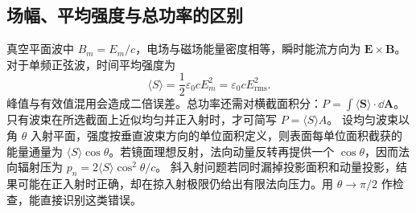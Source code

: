 \subsection{场幅、平均强度与总功率的区别}
真空平面波中 $B_m=E_m/c$，电场与磁场能量密度相等，瞬时能流方向为 $\boldsymbol E\times\boldsymbol B$。对于单频正弦波，时间平均强度为
\[
 \langle S\rangle=\frac12\varepsilon_0cE_m^2
 =\varepsilon_0cE_{\mathrm{rms}}^2.
\]
峰值与有效值混用会造成二倍误差。总功率还需对横截面积分：$P=\int\langle\boldsymbol S\rangle\cdot\dd\boldsymbol A$。只有波束在所选截面上近似均匀并正入射时，才可简写 $P=\langle S\rangle A$。
设均匀波束以角 $\theta$ 入射平面，强度按垂直波束方向的单位面积定义，则表面每单位面积截获的能量通量为 $\langle S\rangle\cos\theta$。若镜面理想反射，法向动量反转再提供一个 $\cos\theta$，因而法向辐射压为
$p_n=2\langle S\rangle\cos^2\theta/c$。
斜入射问题若同时漏掉投影面积和动量投影，结果可能在正入射时正确，却在掠入射极限仍给出有限法向压力。用 $\theta\to\pi/2$ 作检查，能直接识别这类错误。

